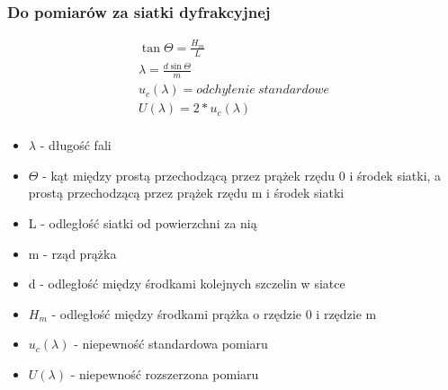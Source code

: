 \documentclass{article}
\begin{document}
\subsubsection{Do pomiarów za siatki dyfrakcyjnej}
\begin{gather*}
    \tan\Theta = \frac{H_{m}}{L} \\
    \lambda = \frac{d\sin\Theta}{m} \\
    u_{c}(\lambda) = odchylenie\ standardowe \\
    U(\lambda) = 2 * u_{c}(\lambda) \\
\end{gather*}
\begin{itemize}
    \item $\lambda$ - długość fali
    \item $\Theta$ - kąt między prostą przechodzącą przez prążek rzędu 0 i środek siatki, a prostą przechodzącą przez prążek rzędu m i środek siatki 
    \item L - odległość siatki od powierzchni za nią
    \item m - rząd prążka
    \item d - odległość między środkami kolejnych szczelin w siatce
    \item $H_{m}$ - odległość między środkami prążka o rzędzie 0 i rzędzie m
    \item $u_{c}(\lambda)$ - niepewność standardowa pomiaru
    \item $U(\lambda)$ - niepewność rozszerzona pomiaru
\end{itemize}
\end{document}
